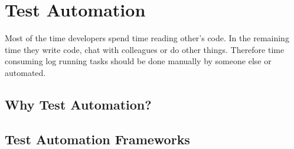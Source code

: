 \documentclass[12pt, notitlepage]{article}
\begin{document}
\section{Test Automation}
Most of the time developers spend time reading other's code. In the remaining time they write code, chat with colleagues or do other things.
Therefore time consuming log running tasks should be done manually by someone else or automated. 
\subsection{Why Test Automation?}
\subsection{Test Automation Frameworks}



\end{document}
